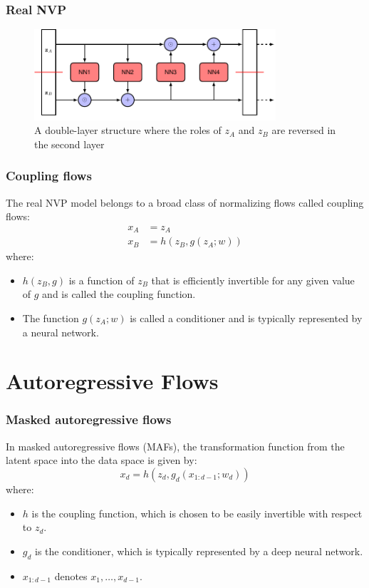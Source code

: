 \documentclass{beamer}
\begin{document}
\begin{frame}
    \frametitle{Real NVP}
    \begin{figure}
        \caption{A double-layer structure where the roles of $z_{A}$ and $z_{B}$ are reversed in the second layer}
        \includegraphics[width=0.8\textwidth]{Figure_2.pdf}
    \end{figure}
\end{frame}

\begin{frame}
    \frametitle{Coupling flows}
    The real NVP model belongs to a broad class of normalizing flows called coupling flows:
    \begin{align*}
        x_{A}&=z_{A} \\
        x_{B}&=h(z_{B},g(z_{A};w))
    \end{align*}
    where:
    \begin{itemize}
        \item $h(z_{B},g)$ is a function of $z_{B}$ that is efficiently invertible for any given value of $g$ and is called the coupling function.
        \item The function $g(z_{A};w)$ is called a conditioner and is typically represented by a neural network.
    \end{itemize}
\end{frame}

\section{Autoregressive Flows}

\begin{frame}
    \frametitle{Masked autoregressive flows}
    In masked autoregressive flows (MAFs), the transformation function from the latent space into the data space is given by:
    \begin{equation*}
        x_{d}=h(z_{d},g_{d}(x_{1:d-1};w_{d}))
    \end{equation*}
    where:
    \begin{itemize}
        \item $h$ is the coupling function, which is chosen to be easily invertible with respect to $z_{d}$.
        \item $g_{d}$ is the conditioner, which is typically represented by a deep neural network.
        \item $x_{1:d-1}$ denotes $x_{1},\hdots,x_{d-1}$.
    \end{itemize}
\end{frame}
\end{document}
